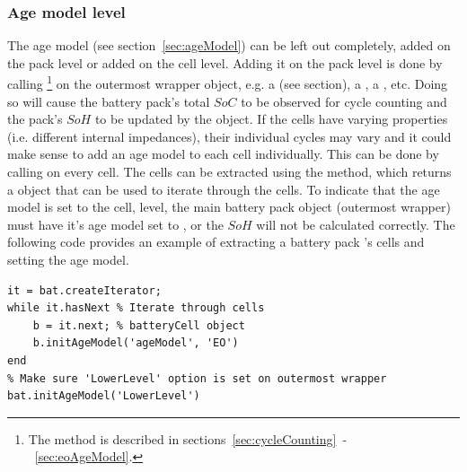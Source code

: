 \subsubsection{Age model level}
\label{sec:AgeModelLevel}
The age model (see section~\ref{sec:ageModel}) can be left out completely, added on the pack level or added on the cell level. Adding it on the pack level is done by calling \footnote{The  method is described in sections~\ref{sec:cycleCounting}~-~\ref{sec:eoAgeModel}.} on the outermost wrapper object, e.g. a  (see section), a , a , etc. Doing so will cause the battery pack's total $SoC$ to be observed for cycle counting and the pack's $SoH$ to be updated by the  object. If the cells have varying properties (i.e. different internal impedances), their individual cycles may vary and it could make sense to add an age model to each cell individually. This can be done by calling  on every cell. The cells can be extracted using the  method, which returns a  object that can be used to iterate through the cells. To indicate that the age model is set to the cell, level, the main battery pack object (outermost wrapper) must have it's age model set to , or the $SoH$ will not be calculated correctly. The following code provides an example of extracting a battery pack 's cells and setting the age model.
\begin{lstlisting}
it = bat.createIterator;
while it.hasNext % Iterate through cells
	b = it.next; % batteryCell object
	b.initAgeModel('ageModel', 'EO')
end
% Make sure 'LowerLevel' option is set on outermost wrapper
bat.initAgeModel('LowerLevel')
\end{lstlisting}

